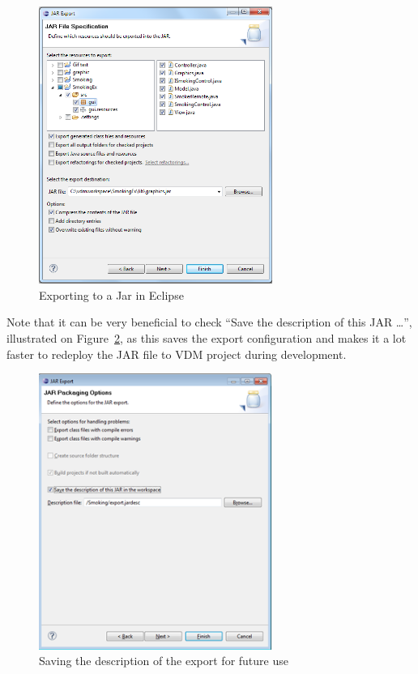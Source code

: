 \documentclass{overturerepchap}
\begin{document}
\begin{figure}[h]
\begin{center}
  \includegraphics[width=3in]{figures/SmokersJarExport}
  \caption[labelInTOC]{Exporting to a Jar in Eclipse}
  \label{fig:gui:JarExport}
\end{center}
\end{figure}

Note that it can be very beneficial to check ``Save the description of this JAR …'', illustrated on Figure~\ref{fig:gui:SaveExport}, as this saves the export configuration and makes it a lot faster to redeploy the JAR file to VDM project during development.

\begin{figure}[h]
\begin{center}
  \includegraphics[width=3in]{figures/SmokersSaveExport}
  \caption[labelInTOC]{Saving the description of the export for future use}
  \label{fig:gui:SaveExport}
\end{center}
\end{figure}
\end{document}
